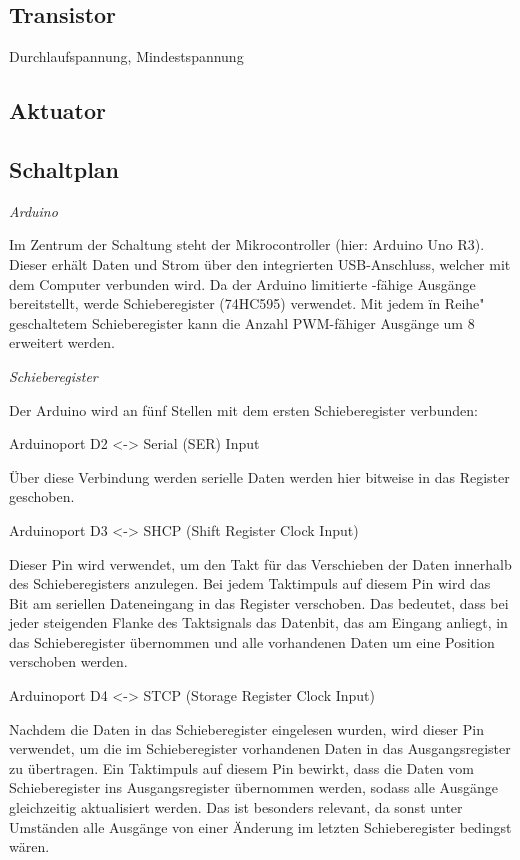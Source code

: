 \subsection{Transistor}
Durchlaufspannung, Mindestspannung
\subsection{Aktuator}\label{subsec:aktuator}

\subsection{Schaltplan}

\textit{Arduino}

Im Zentrum der Schaltung steht der Mikrocontroller (hier: Arduino Uno R3).
Dieser erhält Daten und Strom über den integrierten USB-Anschluss, welcher mit dem Computer verbunden wird.
Da der Arduino limitierte -fähige Ausgänge bereitstellt, werde Schieberegister (74HC595) verwendet.
Mit jedem \"in Reihe" geschaltetem Schieberegister kann die Anzahl PWM-fähiger Ausgänge um 8 erweitert werden.

\textit{Schieberegister}

Der Arduino wird an fünf Stellen mit dem ersten Schieberegister verbunden:

Arduinoport D2 <-> Serial (SER) Input

Über diese Verbindung werden serielle Daten werden hier bitweise in das Register geschoben.

Arduinoport D3 <-> SHCP (Shift Register Clock Input)

Dieser Pin wird verwendet, um den Takt für das Verschieben der Daten innerhalb des Schieberegisters anzulegen.
Bei jedem Taktimpuls auf diesem Pin wird das Bit am seriellen Dateneingang in das Register verschoben.
Das bedeutet, dass bei jeder steigenden Flanke des Taktsignals das Datenbit, das am Eingang anliegt, in das Schieberegister übernommen und alle vorhandenen Daten um eine Position verschoben werden.

Arduinoport D4 <-> STCP (Storage Register Clock Input)

Nachdem die Daten in das Schieberegister eingelesen wurden, wird dieser Pin verwendet, um die im Schieberegister vorhandenen Daten in das Ausgangsregister zu übertragen.
Ein Taktimpuls auf diesem Pin bewirkt, dass die Daten vom Schieberegister ins Ausgangsregister übernommen werden, sodass alle Ausgänge gleichzeitig aktualisiert werden.
Das ist besonders relevant, da sonst unter Umständen alle Ausgänge von einer Änderung im letzten Schieberegister bedingst wären.

